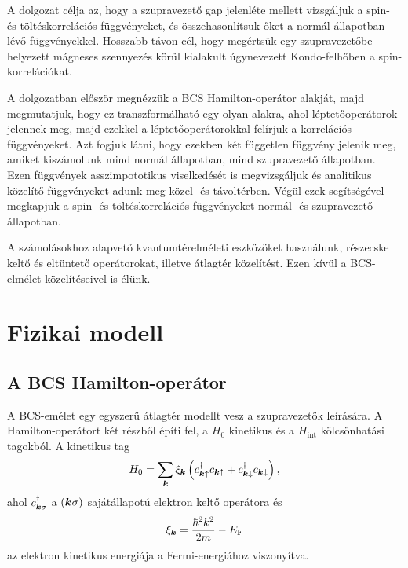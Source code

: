 \documentclass[a4paper,12pt,titlepage]{article}
\newcommand{\KK}{{\vb*{k}}}
\newcommand{\EF}{{E_\text{F}}}
\begin{document}
\newpage

A dolgozat célja az, hogy a szupravezető gap jelenléte mellett vizsgáljuk a spin- és töltéskorrelációs függvényeket, és összehasonlítsuk őket a normál állapotban lévő függvényekkel.  Hosszabb távon cél, hogy megértsük egy szupravezetőbe helyezett mágneses szennyezés körül kialakult úgynevezett Kondo-felhőben a spin-korrelációkat.

A dolgozatban először megnézzük a BCS Hamilton-operátor alakját, majd megmutatjuk, hogy ez transzformálható egy olyan alakra, ahol léptetőoperátorok jelennek meg, majd ezekkel a léptetőoperátorokkal felírjuk a korrelációs függvényeket.  Azt fogjuk látni, hogy ezekben két független függvény jelenik meg, amiket kiszámolunk mind normál állapotban, mind szupravezető állapotban.  Ezen függvények asszimpototikus viselkedését is megvizsgáljuk és analitikus közelítő függvényeket adunk meg közel- és távoltérben.  Végül ezek segítségével megkapjuk a spin- és töltéskorrelációs függvényeket normál- és szupravezető állapotban.

A számolásokhoz alapvető kvantumtérelméleti eszközöket használunk, részecske keltő és eltüntető operátorokat, illetve átlagtér közelítést.  Ezen kívül a BCS-elmélet közelítéseivel is élünk.



\section{Fizikai modell}

\subsection{A BCS Hamilton-operátor}

A BCS-emélet egy egyszerű átlagtér modellt vesz a szupravezetők leírására.  A Hamilton-operátort két részből építi fel, a $H_0$ kinetikus és a $H_\text{int}$ kölcsönhatási tagokból.  A kinetikus tag
\begin{equation}
	H_0 = \sum\limits_\KK \xi_\KK \left( c_{\KK \uparrow}^\dagger c_{\KK \uparrow} + c_{\KK \downarrow}^\dagger c_{\KK \downarrow} \right),
\end{equation}
ahol $c_{\KK \sigma}^\dagger$ a $\left( \KK \sigma \right)$ sajátállapotú elektron keltő operátora és
$$ \xi_\KK = \frac{\hbar^2 k^2}{2 m} - \EF $$
az elektron kinetikus energiája a Fermi-energiához viszonyítva.
\end{document}
